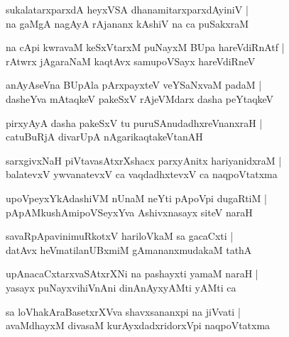 \documentclass[twoside,12pt,openright]{book}
\newcounter{shloka}[chapter]
\begin{document}
\begin{shloka}%
sukalatarxparxdA heyxVSA dhanamitarxparxdAyiniV |\\
na gaMgA nagAyA rAjananx kAshiV na ca puSakxraM 
\end{shloka}

\begin{shloka}%
na cApi kwravaM keSxVtarxM puNayxM BUpa hareVdiRnAtf |\\
rAtwrx jAgaraNaM kaqtAvx samupoVSayx hareVdiRneV 
\end{shloka}

\begin{shloka}%
anAyAseVna BUpAla pArxpayxteV veYSaNxvaM padaM |\\
dasheYva mAtaqkeV pakeSxV rAjeVMdarx dasha peYtaqkeV 
\end{shloka}

\begin{shloka}%
pirxyAyA dasha pakeSxV tu puruSAnudadhxreVnanxraH |\\
catuBuRjA divarUpA nAgarikaqtakeVtanAH 
\end{shloka}

\begin{shloka}%
sarxgivxNaH piVtavasAtxrXshacx parxyAnitx hariyanidxraM |\\
balatevxV ywvanatevxV ca vaqdadhxtevxV ca naqpoVtatxma
\end{shloka}

\begin{shloka}%
upoVpeyxYkAdashiVM nUnaM neYti pApoVpi dugaRtiM |\\
pApAMkushAmipoVSeyxYva Ashivxnasayx siteV naraH 
\end{shloka}

\begin{shloka}%
savaRpApavinimuRkotxV hariloVkaM sa gacaCxti |\\
datAvx heVmatilanUBxmiM gAmananxmudakaM tathA 
\end{shloka}

\begin{shloka}%
upAnacaCxtarxvaSAtxrXNi na pashayxti yamaM naraH |\\
yasayx puNayxvihiVnAni dinAnAyxyAMti yAMti ca 
\end{shloka}

\begin{shloka}%
sa loVhakAraBasetxrXVva shavxsananxpi na jiVvati |\\
avaMdhayxM divasaM kurAyxdadxridorxVpi naqpoVtatxma
\end{shloka}
\end{document}
